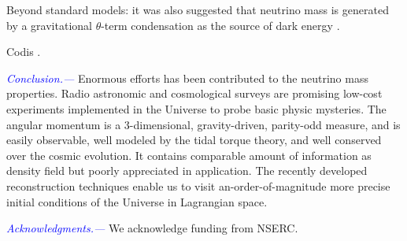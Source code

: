 \documentclass[aps,prd,twocolumn,amsmath,amssymb,amsfont,superscriptaddress]{revtex4-1}
\newcommand{\tcb}{\textcolor{blue}}
\begin{document}
Beyond standard models: it was also suggested that neutrino mass is generated by a gravitational $\theta$-term condensation as the source of dark energy \citep{2016PhRvD..93k3002D}.

Codis \citep{2018MNRAS.tmp.2447C}.

\tcb{\textit{Conclusion.---}} 
Enormous efforts has been contributed to the neutrino mass properties.
Radio astronomic and cosmological surveys are promising low-cost experiments implemented in the Universe to probe basic physic mysteries. 
The angular momentum is a 3-dimensional, gravity-driven, parity-odd measure, 
and is easily observable, well modeled by the tidal torque theory, and well conserved over the cosmic evolution.
It contains comparable amount of information as density field but poorly appreciated in application.
The recently developed reconstruction techniques enable us to visit an-order-of-magnitude more precise initial conditions of the Universe in Lagrangian space.

\tcb{\textit{Acknowledgments.---}}
We acknowledge funding from NSERC.



%
\end{document}
